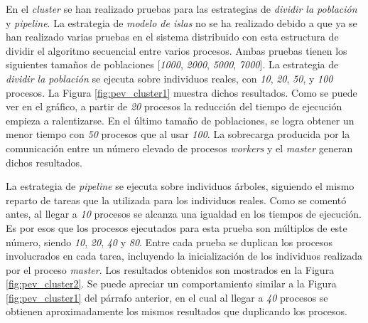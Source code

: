 En el \textit{cluster} se han realizado pruebas para las estrategias de \textit{dividir la población} y \textit{pipeline}. La estrategia de \textit{modelo de islas} no se ha realizado debido a que ya se han realizado varias pruebas en el sistema distribuido con esta estructura de dividir el algoritmo secuencial entre varios procesos. Ambas pruebas tienen los siguientes tamaños de poblaciones [\textit{1000}, \textit{2000}, \textit{5000}, \textit{7000}]. La estrategia de \textit{dividir la población} se ejecuta sobre individuos reales, con \textit{10}, \textit{20}, \textit{50}, y \textit{100} procesos. La Figura \ref{fig:pev_cluster1} muestra dichos resultados. Como se puede ver en el gráfico, a partir de \textit{20} procesos la reducción del tiempo de ejecución empieza a ralentizarse. En el último tamaño de poblaciones, se logra obtener un menor tiempo con \textit{50} procesos que al usar \textit{100}. La sobrecarga producida por la comunicación entre un número elevado de procesos \textit{workers} y el \textit{master} generan dichos resultados.

La estrategia de \textit{pipeline} se ejecuta sobre individuos árboles, siguiendo el mismo reparto de tareas que la utilizada para los individuos reales. Como se comentó antes, al llegar a \textit{10} procesos se alcanza una igualdad en los tiempos de ejecución. Es por esos que los procesos ejecutados para esta prueba son múltiplos de este número, siendo \textit{10}, \textit{20}, \textit{40} y \textit{80}. Entre cada prueba se duplican los procesos involucrados en cada tarea, incluyendo la inicialización de los individuos realizada por el proceso \textit{master}. Los resultados obtenidos son mostrados en la Figura \ref{fig:pev_cluster2}. Se puede apreciar un comportamiento similar a la Figura \ref{fig:pev_cluster1} del párrafo anterior, en el cual al llegar a \textit{40} procesos se obtienen aproximadamente los mismos resultados que duplicando los procesos.




